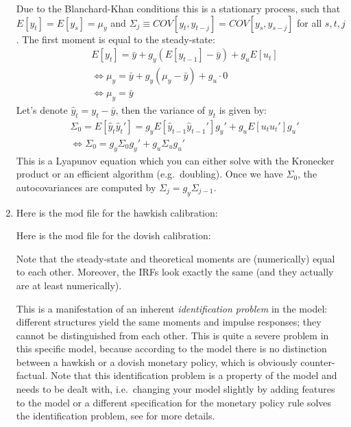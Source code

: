 \begin{enumerate}
Due to the Blanchard-Khan conditions this is a stationary process,
  such that $E[y_t] = E[y_s] = \mu_y$ and $\Sigma_{j} \equiv COV[y_t,y_{t-j}] = COV[y_{s}, y_{s-j}]$ for all $s,t,j$.
The first moment is equal to the steady-state:
\begin{align*}
&E [y_t] = \bar{y} + g_y (E [y_{t-1}] - \bar{y}) + g_u E [u_t]
\\
&\Leftrightarrow \mu_y = \bar{y} + g_y(\mu_y - \bar{y}) + g_u \cdot 0
\\
&\Leftrightarrow \mu_y = \bar{y}
\end{align*}
Let's denote $\hat{y}_t = y_t - \bar{y}$, then the variance of $y_t$ is given by:
\begin{align*}
&\Sigma_0 = E[\hat{y}_t \hat{y}_t'] = g_y E[\hat{y}_{t-1} \hat{y}_{t-1}'] g_y' + g_u E[u_t u_t'] g_u'
\\
&\Leftrightarrow \Sigma_0 = g_y \Sigma_0 g_y' + g_u \Sigma_u g_u'
\end{align*}
This is a Lyapunov equation which you can either solve with the Kronecker product or an efficient algorithm (e.g.\ doubling).
Once we have $\Sigma_0$, the autocovariances are computed by $\Sigma_j = g_y \Sigma_{j-1}$.

\item Here is the mod file for the hawkish calibration:


Here is the mod file for the dovish calibration:


Note that the steady-state and theoretical moments are (numerically) equal to each other.
Moreover, the IRFs look exactly the same (and they actually are at least numerically).

This is a manifestation of an inherent \emph{identification problem} in the model:
  different structures yield the same moments and impulse responses;
  they cannot be distinguished from each other.
This is quite a severe problem in this specific model,
  because according to the model there is no distinction between a hawkish or a dovish monetary policy,
  which is obviously counter-factual.
Note that this identification problem is a property of the model
  and needs to be dealt with, i.e.\ changing your model slightly by adding features to the model
  or a different specification for the monetary policy rule
  solves the identification problem, see \textcite{Ivashchenko.Mutschler_2020_EffectObservablesFunctional} for more details.


\end{enumerate}
